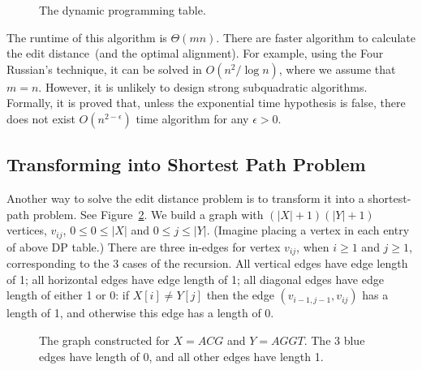 \begin{figure}[t!]
\centering{}
\caption{The dynamic programming table.}
\label{fig:table}
\end{figure}

The runtime of this algorithm is $\Theta(mn)$.
There are faster algorithm to calculate the edit distance~(and the optimal alignment).
For example, using the Four Russian's technique, it can be solved in $O(n^2/\log n)$, where we assume that $m = n$.
However, it is unlikely to design strong subquadratic algorithms.
Formally, it is proved that, unless the exponential time hypothesis is false, there does not exist $O(n^{2-\epsilon})$ time
algorithm for any $\epsilon > 0$.


\begin{algorithmblock}[0.8\textwidth]
	\xxx
	\xxx
	\xxx
	\xxx
	\xxx
	\xxx
	\xxx
	\xxx
	\xxx
	\xxx
	\xxx
\end{algorithmblock}


\subsection*{Transforming into Shortest Path Problem}

Another way to solve the edit distance problem is to transform it into a shortest-path problem.
See Figure~\ref{fig:graph}.
We build a graph with $(|X| + 1)(|Y| + 1)$ vertices, $v_{ij}$, $0\le 0 \le |X|$ and $0\le j \le |Y|$. 
(Imagine placing a vertex in each entry of above DP table.)
There are three in-edges for vertex $v_{ij}$, when $i\ge 1$ and $j \ge 1$, corresponding to
the 3 cases of the recursion. 
All vertical edges have edge length of 1;
all horizontal edges have edge length of 1;
all diagonal edges have edge length of either 1 or 0: 
if $X[i] \neq Y[j]$ then the edge $(v_{i-1,j-1}, v_{ij})$ has a length of 1,
and otherwise this edge has a length of 0.

\begin{figure}[h]
\centering{}
\caption{The graph constructed for $X=ACG$ and $Y = AGGT$. The 3 blue edges have length of 0, and all other edges have length 1.}
\label{fig:graph}
\end{figure}

